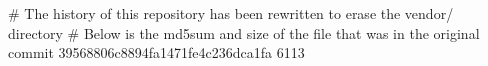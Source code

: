 # The history of this repository has been rewritten to erase the vendor/ directory
# Below is the md5sum and size of the file that was in the original commit
39568806c8894fa1471fe4c236dca1fa
6113
